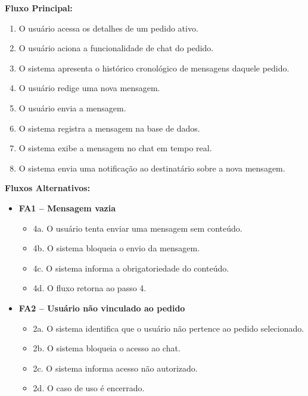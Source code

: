 \documentclass[
	article,			%
	11pt,				%
	oneside,			%
	a4paper,			%
	english,			%
	brazil,				%
	sumario=tradicional
	]{abntex2}
\begin{document}
\vspace{0.5em}
\noindent\textbf{Fluxo Principal:}
\begin{enumerate}[label=\arabic*.]
    \item O usuário acessa os detalhes de um pedido ativo.
    \item O usuário aciona a funcionalidade de chat do pedido.
    \item O sistema apresenta o histórico cronológico de mensagens daquele pedido.
    \item O usuário redige uma nova mensagem.
    \item O usuário envia a mensagem.
    \item O sistema registra a mensagem na base de dados.
    \item O sistema exibe a mensagem no chat em tempo real.
    \item O sistema envia uma notificação ao destinatário sobre a nova mensagem.
\end{enumerate}

\vspace{0.5em}
\noindent\textbf{Fluxos Alternativos:}
\begin{itemize}[leftmargin=*]
    \item \textbf{FA1 – Mensagem vazia}
    \begin{itemize}[label={}, leftmargin=0.5cm]
        \item 4a. O usuário tenta enviar uma mensagem sem conteúdo.
        \item 4b. O sistema bloqueia o envio da mensagem.
        \item 4c. O sistema informa a obrigatoriedade do conteúdo.
        \item 4d. O fluxo retorna ao passo 4.
    \end{itemize}
    
    \item \textbf{FA2 – Usuário não vinculado ao pedido}
    \begin{itemize}[label={}, leftmargin=0.5cm]
        \item 2a. O sistema identifica que o usuário não pertence ao pedido selecionado.
        \item 2b. O sistema bloqueia o acesso ao chat.
        \item 2c. O sistema informa acesso não autorizado.
        \item 2d. O caso de uso é encerrado.
    \end{itemize}
\end{itemize}
\end{document}
